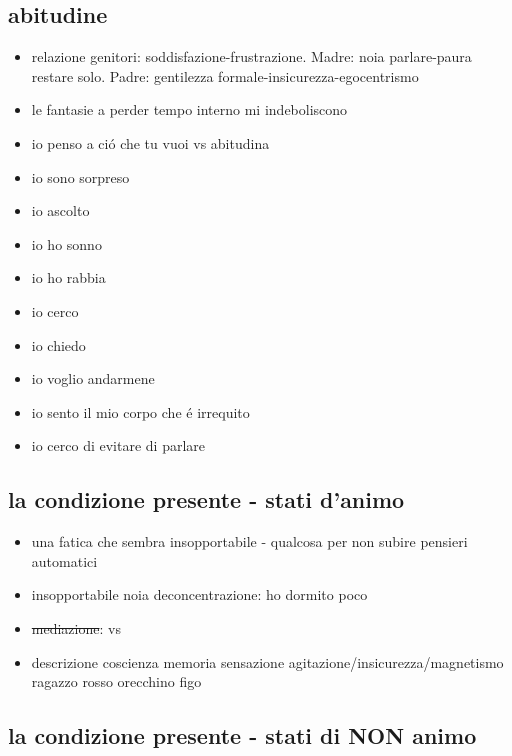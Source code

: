 \subsection{abitudine}

\begin{itemize}
\item relazione genitori: soddisfazione-frustrazione.
Madre: noia parlare-paura restare solo.
Padre: gentilezza formale-insicurezza-egocentrismo

\item le fantasie a perder tempo interno mi indeboliscono
\item io penso a ci\'o che tu vuoi vs abitudina
\item io sono sorpreso
\item io ascolto 
\item io ho sonno
\item io ho rabbia
\item io cerco
\item io chiedo
\item io voglio andarmene
\item io sento il mio corpo che \'e irrequito
\item io cerco di evitare di parlare

\end{itemize}

\subsection{la condizione presente - stati d'animo}

\begin{itemize}

\item una fatica che sembra insopportabile - qualcosa per non subire pensieri automatici

\item insopportabile noia deconcentrazione: ho dormito poco

\item \sout{mediazione}:  vs 

\item descrizione coscienza memoria sensazione agitazione/insicurezza/magnetismo ragazzo rosso orecchino figo

\end{itemize}

\subsection{la condizione presente - stati di NON animo}

